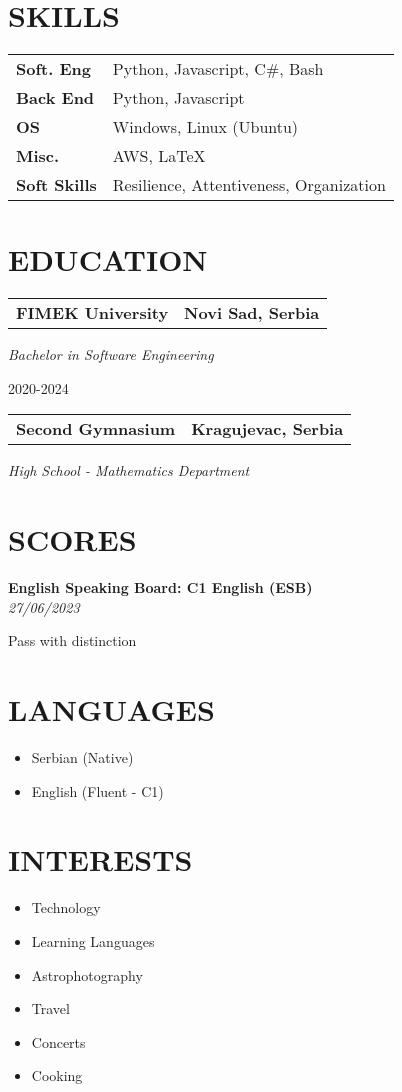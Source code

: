 \documentclass[11pt,a4paper]{moderncv}
\newcommand*{\educationentry}[4][0.5mm]{
    \begin{tabularx}{\textwidth}{LR}
        {\bfseries #3} & {\bfseries #4} \\
    \end{tabularx}
    {\itshape #2}
    \par\addvspace{#1}
}
\newcommand*{\scoreentry}[3][2.5mm]{
    {\bfseries #2} \\
    {\itshape #3}
    \par\addvspace{#1}
}
\begin{document}
\begin{minipage}[t]{0.35\textwidth}
    \section{SKILLS}
    \begin{tabularx}{\textwidth}{>{\bfseries}l@{\hskip 3.5mm}L}
        Soft. Eng   & Python, Javascript, C\#, Bash           \\
        Back End    & Python, Javascript                      \\
        OS          & Windows, Linux (Ubuntu)                 \\
        Misc.       & AWS, \LaTeX                             \\
        Soft Skills & Resilience, Attentiveness, Organization
    \end{tabularx}

    \section{EDUCATION}
    \educationentry{Bachelor in Software Engineering}{FIMEK University}{Novi Sad, Serbia}
    2020-2024
    \par
    \vspace{3.0mm}
    \educationentry{High School - Mathematics Department}{Second Gymnasium}{Kragujevac, Serbia}

    \section{SCORES}
    \scoreentry{English Speaking Board: C1 English (ESB)}{27/06/2023}
    Pass with distinction


    \section{LANGUAGES}
    \begin{itemize}
        \item Serbian (Native)
        \item English (Fluent - C1)
    \end{itemize}

    \section{INTERESTS}
    \begin{itemize}
        \item Technology
        \item Learning Languages
        \item Astrophotography
        \item Travel
        \item Concerts
        \item Cooking
    \end{itemize}
\end{minipage}
\end{document}
